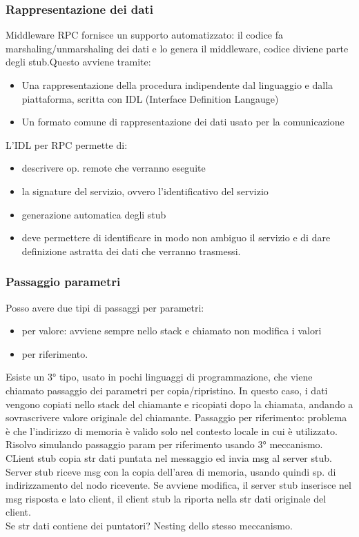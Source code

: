 \documentclass[16px]{article}
\begin{document}
\subsubsection{Rappresentazione dei dati}
Middleware RPC fornisce un supporto automatizzato: il codice fa marshaling/unmarshaling dei dati e lo genera il middleware, codice diviene parte degli stub.Questo avviene tramite:
\begin{itemize}
\item Una rappresentazione della procedura indipendente dal linguaggio e dalla piattaforma, scritta con IDL (Interface Definition Langauge)
\item Un formato comune di rappresentazione dei dati usato per la comunicazione
\end{itemize}
L'IDL per RPC permette di:
\begin{itemize}
\item descrivere op. remote che verranno eseguite
\item la signature del servizio, ovvero l'identificativo del servizio
\item generazione automatica degli stub
\item deve permettere di identificare in modo non ambiguo il servizio e di dare definizione astratta dei dati che verranno trasmessi.
\end{itemize}
\subsubsection{Passaggio parametri}
Posso avere due tipi di passaggi per parametri: 
\begin{itemize}
\item per valore: avviene sempre nello stack e chiamato non modifica i valori
\item per riferimento.
\end{itemize}
Esiste un 3° tipo, usato in pochi linguaggi di programmazione, che viene chiamato passaggio dei parametri per copia/ripristino. In questo caso, i dati vengono copiati nello stack del chiamante e ricopiati dopo la chiamata, andando a sovrascrivere valore originale del chiamante. Passaggio per riferimento: problema è che l'indirizzo di memoria è valido solo nel contesto locale in cui è utilizzato. Risolvo simulando passaggio param per riferimento usando 3° meccanismo. CLient stub copia str dati puntata nel messaggio ed invia msg al server stub. Server stub riceve msg con la copia dell'area di memoria, usando quindi sp. di indirizzamento del nodo ricevente. Se avviene modifica, il server stub inserisce nel msg risposta e lato client, il client stub la riporta nella str dati originale del client.\\ Se str dati contiene dei puntatori? Nesting dello stesso meccanismo.
\end{document}
